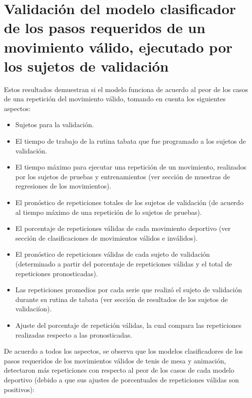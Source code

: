 \section{Validaci\'on del modelo clasificador de los pasos requeridos de un movimiento v\'alido,  ejecutado por los sujetos de validaci\'on} \label{res:valResults}
Estos resultados demuestran si el modelo funciona de acuerdo al peor de los casos de una repetici\'on del movimiento v\'alido, tomando en cuenta los siguientes aspectos:
\begin{itemize}
\item Sujetos para la validaci\'on.
\item El tiempo de trabajo de la rutina tabata que fue programado a los sujetos de validaci\'on.
\item El tiempo m\'aximo para ejecutar una repetici\'on de un movimiento, realizados por los sujetos de pruebas y entrenamientos (ver secci\'on de muestras de regresiones de los movimientos).
\item El pron\'ostico de repeticiones totales de los sujetos de validaci\'on (de acuerdo al tiempo m\'aximo de una repetici\'on de lo sujetos de pruebas).
\item El porcentaje de repeticiones v\'alidas de cada movimiento deportivo (ver secci\'on de clasificaciones de movimientos v\'alidos e inv\'alidos).
\item El pron\'ostico de repeticiones v\'alidas de cada sujeto de validaci\'on (determinado a partir del porcentaje de repeticiones v\'alidas y el total de repeticiones pronosticadas).
\item Las repeticiones promedios por cada serie que realiz\'o el sujeto de validaci\'on durante su rutina de tabata (ver secci\'on de resultados de los sujetos de validaci\'ion).
\item  Ajuste del porcentaje de repetici\'on v\'alidas, la cual compara las repeticiones realizadas respecto a las pronosticadas.
\end{itemize}
De acuerdo a todos los aspectos, se observa que los  modelos clasificadores de los pasos requeridos de los movimientos v\'alidos de tenis de mesa y animaci\'on, detectaron m\'as repeticiones con respecto al peor de los casos de cada modelo deportivo (debido a que sus ajustes de porcentuales de repeticiones v\'alidas son positivos):
